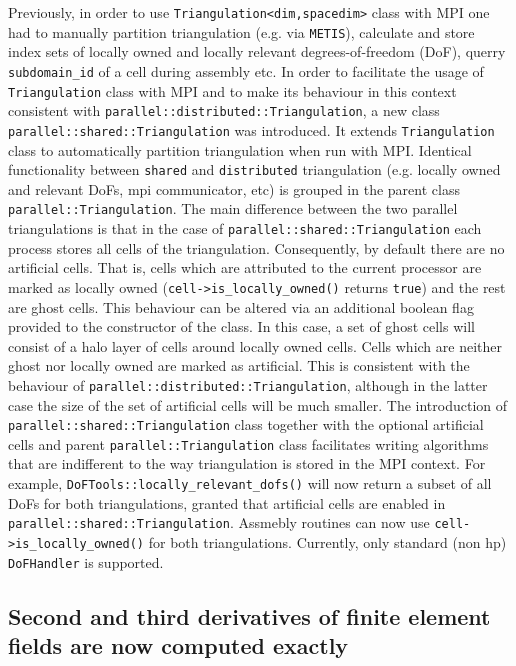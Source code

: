 \documentclass{ansarticle-preprint}
\begin{document}
Previously, in order to use \texttt{Triangulation<dim,spacedim>} class with MPI one had to manually
partition triangulation (e.g. via \texttt{METIS}), calculate and store index sets of locally owned and locally relevant degrees-of-freedom (DoF), querry \texttt{subdomain\_id}  of a cell during assembly etc.
In order to facilitate the usage of \texttt{Triangulation} class with MPI
and to make its behaviour in this context consistent with \texttt{parallel::distributed::Triangulation}, a new class
\texttt{parallel::shared::Triangulation} was introduced.
It extends \texttt{Triangulation} class to automatically partition triangulation when run with MPI.
Identical functionality between \texttt{shared} and \texttt{distributed} triangulation
(e.g. locally owned and relevant DoFs, mpi communicator, etc)
is grouped in the parent class \texttt{parallel::Triangulation}.
The main difference between the two parallel triangulations is that in the case of
\texttt{parallel::shared::Triangulation} each process stores all cells of the triangulation.
Consequently, by default there are no artificial cells.
That is, cells which are attributed to the current processor are marked as locally owned
(\texttt{cell->is\_locally\_owned()} returns \texttt{true})
and the rest are ghost cells.
This behaviour can be altered via an additional boolean flag provided to the constructor of the class.
In this case, a set of ghost cells will consist of a halo layer of cells around locally owned cells.
Cells which are neither ghost nor locally owned are marked as artificial.
This is consistent with the behaviour of \texttt{parallel::distributed::Triangulation},
although in the latter case the size of the set of artificial cells will be much smaller.
The introduction of \texttt{parallel::shared::Triangulation} class together with the
optional artificial cells and parent \texttt{parallel::Triangulation} class
facilitates writing
algorithms that are indifferent to the way triangulation is stored in the MPI context.
For example, \texttt{DoFTools::locally\_relevant\_dofs()} will now return a subset of
all DoFs for both triangulations, granted that artificial cells are enabled in
\texttt{parallel::shared::Triangulation}.
Assmebly routines can now use \texttt{cell->is\_locally\_owned()}
for both triangulations.
Currently, only standard (non hp) \texttt{DoFHandler} is supported.

\subsection{Second and third derivatives of finite element fields are now
  computed exactly}
\end{document}
